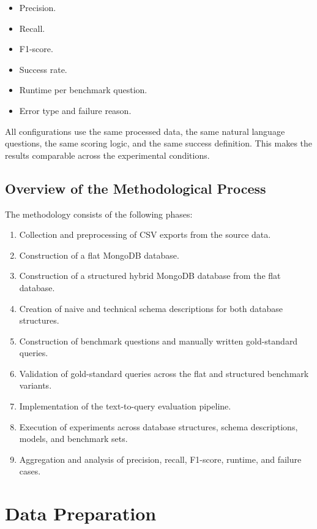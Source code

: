 \begin{itemize}
    \item Precision.
    \item Recall.
    \item F1-score.
    \item Success rate.
    \item Runtime per benchmark question.
    \item Error type and failure reason.
\end{itemize}

All configurations use the same processed data, the same natural language questions, the same scoring logic, and the same success definition. This makes the results comparable across the experimental conditions.

\subsection{Overview of the Methodological Process}

The methodology consists of the following phases:

\begin{enumerate}
    \item Collection and preprocessing of CSV exports from the source data.
    \item Construction of a flat MongoDB database.
    \item Construction of a structured hybrid MongoDB database from the flat database.
    \item Creation of naive and technical schema descriptions for both database structures.
    \item Construction of benchmark questions and manually written gold-standard queries.
    \item Validation of gold-standard queries across the flat and structured benchmark variants.
    \item Implementation of the text-to-query evaluation pipeline.
    \item Execution of experiments across database structures, schema descriptions, models, and benchmark sets.
    \item Aggregation and analysis of precision, recall, F1-score, runtime, and failure cases.
\end{enumerate}

\section{Data Preparation}

